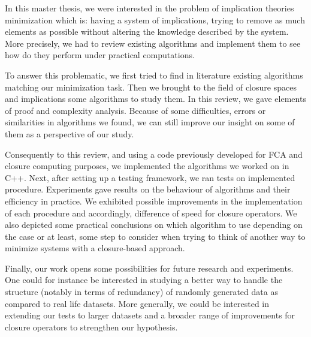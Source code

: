 \documentclass[a4paper, 10pt]{report}
\begin{document}


In this master thesis, we were interested in the problem of implication theories minimization which is: having a system of implications, trying to remove as much elements as possible without altering the knowledge described by
the system. More precisely, we had to review existing algorithms and implement them to see how do they perform under practical computations.

\vspace{1.2em}

To answer this problematic, we first tried to find in literature existing algorithms matching our minimization task. Then we brought to the field of closure spaces and implications some algorithms to study them. In this review, we gave elements of proof and complexity analysis. Because of some difficulties, errors or similarities in algorithms we found, we can still improve our insight on some of them as a perspective of our study.

\vspace{1.2em}

Consequently to this review, and using a code previously developed for FCA and closure computing purposes, we implemented the algorithms we worked on in C++. Next, after setting up a testing framework, we ran tests on implemented procedure. Experiments gave results on the behaviour of algorithms
and their efficiency in practice. We exhibited  possible improvements in the implementation of each procedure and accordingly, difference of speed
for closure operators. We also depicted some practical conclusions on which algorithm to use depending on the case or at least, some step to consider when trying to think of another way to minimize systems with a closure-based approach.

\vspace{1.2em}

Finally, our work opens some possibilities for future research and experiments. One could for instance be interested in studying a better way to handle the structure (notably in terms of redundancy) of randomly generated data as compared to real life datasets. More generally, we could be interested in extending our tests to larger datasets and a broader range of improvements for closure operators to strengthen our hypothesis.




\newpage
{}
\setcounter{page}{8}


	

\newpage
\end{document}
